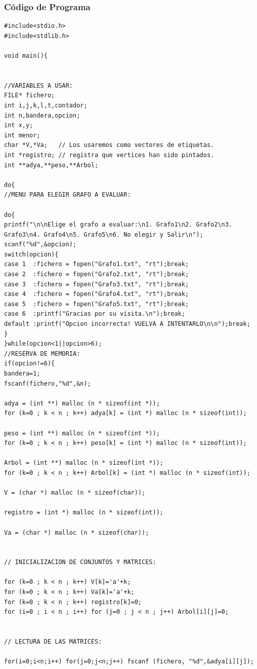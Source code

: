 \documentclass[a4paper]{article}
\begin{document}
\subsubsection{C\'odigo de Programa}
\begin{lstlisting}[style=C]
#include<stdio.h>
#include<stdlib.h>

void main(){


//VARIABLES A USAR:
FILE* fichero;
int i,j,k,l,t,contador;           
int n,bandera,opcion;			   
int x,y; 			        
int menor;   
char *V,*Va;   // Los usaremos como vectores de etiquetas.
int *registro; // registra que vertices han sido pintados.			 
int **adya,**peso,**Arbol;	

do{
//MENU PARA ELEGIR GRAFO A EVALUAR:

do{
printf("\n\nElige el grafo a evaluar:\n1. Grafo1\n2. Grafo2\n3. Grafo3\n4. Grafo4\n5. Grafo5\n6. No elegir y Salir\n");
scanf("%d",&opcion);
switch(opcion){
case 1  :fichero = fopen("Grafo1.txt", "rt");break;
case 2  :fichero = fopen("Grafo2.txt", "rt");break;
case 3  :fichero = fopen("Grafo3.txt", "rt");break;
case 4  :fichero = fopen("Grafo4.txt", "rt");break;
case 5  :fichero = fopen("Grafo5.txt", "rt");break;
case 6  :printf("Gracias por su visita.\n");break;
default :printf("Opcion incorrecta! VUELVA A INTENTARLO\n\n");break;
}
}while(opcion<1||opcion>6);
//RESERVA DE MEMORIA:
if(opcion!=6){ 
bandera=1;
fscanf(fichero,"%d",&n);

adya = (int **) malloc (n * sizeof(int *));
for (k=0 ; k < n ; k++) adya[k] = (int *) malloc (n * sizeof(int));

peso = (int **) malloc (n * sizeof(int *));
for (k=0 ; k < n ; k++) peso[k] = (int *) malloc (n * sizeof(int));

Arbol = (int **) malloc (n * sizeof(int *));
for (k=0 ; k < n ; k++) Arbol[k] = (int *) malloc (n * sizeof(int));

V = (char *) malloc (n * sizeof(char));  

registro = (int *) malloc (n * sizeof(int));

Va = (char *) malloc (n * sizeof(char)); 


// INICIALIZACION DE CONJUNTOS Y MATRICES: 

for (k=0 ; k < n ; k++) V[k]='a'+k; 
for (k=0 ; k < n ; k++) Va[k]='a'+k;
for (k=0 ; k < n ; k++) registro[k]=0;
for (i=0 ; i < n ; i++) for (j=0 ; j < n ; j++) Arbol[i][j]=0;


// LECTURA DE LAS MATRICES:

for(i=0;i<n;i++) for(j=0;j<n;j++) fscanf (fichero, "%d",&adya[i][j]);


\end{lstlisting}
\end{document}
